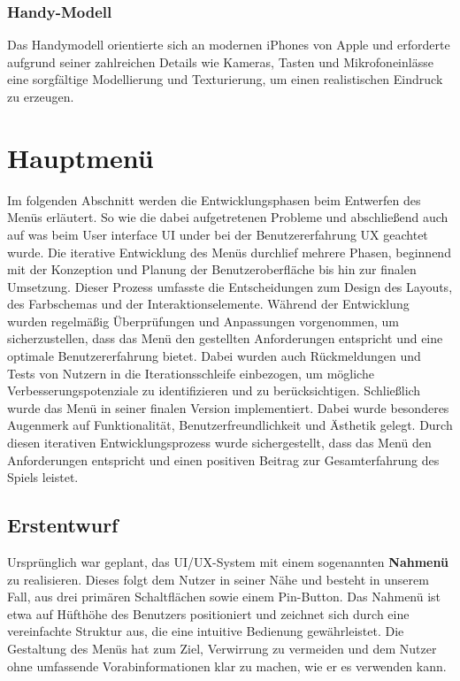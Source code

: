 \subsubsection*{Handy-Modell}
Das Handymodell orientierte sich an modernen iPhones von Apple und erforderte aufgrund seiner zahlreichen Details wie
Kameras, Tasten und Mikrofoneinlässe eine sorgfältige Modellierung und Texturierung, um einen realistischen Eindruck zu erzeugen.


\section{Hauptmenü}
Im folgenden Abschnitt werden die Entwicklungsphasen beim Entwerfen des Menüs erläutert. So wie die dabei aufgetretenen
Probleme und abschließend auch auf was beim User interface UI under bei der Benutzererfahrung UX geachtet wurde.
Die iterative Entwicklung des Menüs durchlief mehrere Phasen, beginnend mit der Konzeption und Planung der
Benutzeroberfläche bis hin zur finalen Umsetzung. Dieser Prozess umfasste die Entscheidungen zum Design des Layouts, des
Farbschemas und der Interaktionselemente. Während der Entwicklung wurden regelmäßig Überprüfungen und Anpassungen
vorgenommen, um sicherzustellen, dass das Menü den gestellten Anforderungen entspricht und eine optimale Benutzererfahrung
bietet. Dabei wurden auch Rückmeldungen und Tests von Nutzern in die Iterationsschleife einbezogen, um mögliche
Verbesserungspotenziale zu identifizieren und zu berücksichtigen.
Schließlich wurde das Menü in seiner finalen Version implementiert. Dabei wurde besonderes Augenmerk auf Funktionalität,
Benutzerfreundlichkeit und Ästhetik gelegt. Durch diesen iterativen Entwicklungsprozess wurde sichergestellt, dass das
Menü den Anforderungen entspricht und einen positiven Beitrag zur Gesamterfahrung des Spiels leistet.

\subsection{Erstentwurf}
Ursprünglich war geplant, das UI/UX-System mit einem sogenannten \textbf{Nahmenü} zu realisieren. Dieses folgt dem
Nutzer in seiner Nähe und besteht in unserem Fall, aus drei primären Schaltflächen sowie einem Pin-Button. Das Nahmenü
ist etwa auf Hüfthöhe des Benutzers positioniert und zeichnet sich durch eine vereinfachte Struktur aus, die eine
intuitive Bedienung gewährleistet. Die Gestaltung des Menüs hat zum Ziel, Verwirrung zu vermeiden und dem Nutzer ohne
umfassende Vorabinformationen klar zu machen, wie er es verwenden kann.

